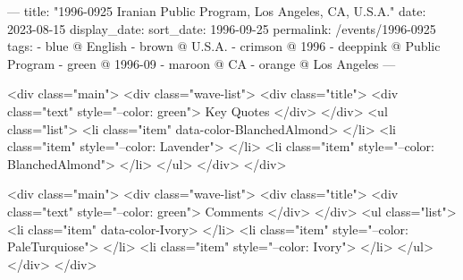 ---
title: "1996-0925 Iranian Public Program, Los Angeles, CA, U.S.A."
date: 2023-08-15
display_date: 
sort_date: 1996-09-25
permalink: /events/1996-0925
tags:
  - blue @ English
  - brown @ U.S.A.
  - crimson @ 1996
  - deeppink @ Public Program
  - green @ 1996-09
  - maroon @ CA
  - orange @ Los Angeles
---

<div class="main">
  <div class="wave-list">
    <div class="title">
      <div class="text" style="--color: green">
        Key Quotes
      </div>
    </div>
    <ul class="list">
        <li class="item" data-color-BlanchedAlmond>
        </li>
        <li class="item" style="--color: Lavender">
        </li>
        <li class="item" style="--color: BlanchedAlmond">
        </li>
      </ul>
  </div>
</div>

<div class="main">
  <div class="wave-list">
    <div class="title">
      <div class="text" style="--color: green">
        Comments
      </div>
    </div>
    <ul class="list">
        <li class="item" data-color-Ivory>
        </li>
        <li class="item" style="--color: PaleTurquiose">
        </li>
        <li class="item" style="--color: Ivory">
        </li>
      </ul>
  </div>
</div>